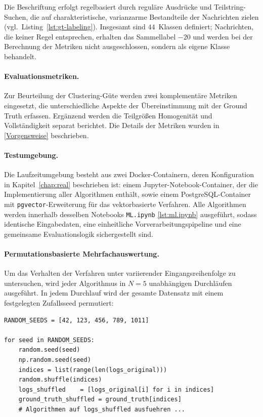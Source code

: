 Die Beschriftung erfolgt regelbasiert durch reguläre Ausdrücke und
Teilstring-Suchen, die auf charakteristische, varianzarme Bestandteile der
Nachrichten zielen (vgl.\ Listing~\ref{lst:gt-labeling}). Insgesamt sind
$44$~Klassen definiert; Nachrichten, die keiner Regel entsprechen, erhalten
das Sammellabel $-20$ und werden bei der Berechnung der Metriken nicht
ausgeschlossen, sondern als eigene Klasse behandelt. 

\paragraph{Evaluationsmetriken.}
Zur Beurteilung der Clustering-Güte werden zwei komplementäre Metriken eingesetzt, die
unterschiedliche Aspekte der Übereinstimmung mit der Ground Truth erfassen. Ergänzend werden
die Teilgrößen Homogenität und Vollständigkeit separat berichtet.
Die Details der Metriken wurden in \ref{Vorgensweise} beschrieben. 


\paragraph{Testumgebung.}
Die Laufzeitumgebung besteht aus zwei Docker-Containern, deren Konfiguration in
Kapitel~\ref{chap:real} beschrieben ist: einem Jupyter-Notebook-Container, der die
Implementierung aller Algorithmen enthält, sowie einem PostgreSQL-Container mit
\texttt{pgvector}-Erweiterung für das vektorbasierte Verfahren. Alle Algorithmen werden
innerhalb desselben Notebooks \texttt{ML.ipynb} \ref{lst:ml.ipynb} ausgeführt, sodass identische Eingabedaten,
eine einheitliche Vorverarbeitungspipeline und eine gemeinsame Evaluationslogik sichergestellt
sind.

\paragraph{Permutationsbasierte Mehrfachauswertung.}
Um das Verhalten der Verfahren unter variierender Eingangsreihenfolge zu untersuchen, wird
jeder Algorithmus in $N = 5$ unabhängigen Durchläufen ausgeführt. In jedem Durchlauf wird
der gesamte Datensatz mit einem festgelegten Zufallsseed permutiert:

\begin{lstlisting}[caption={Konfiguration der Mehrfachauswertung}, label={lst:eval-seeds}]
RANDOM_SEEDS = [42, 123, 456, 789, 1011]

for seed in RANDOM_SEEDS:
    random.seed(seed)
    np.random.seed(seed)
    indices = list(range(len(logs_original)))
    random.shuffle(indices)
    logs_shuffled    = [logs_original[i] for i in indices]
    ground_truth_shuffled = ground_truth[indices]
    # Algorithmen auf logs_shuffled ausfuehren ...
\end{lstlisting}

